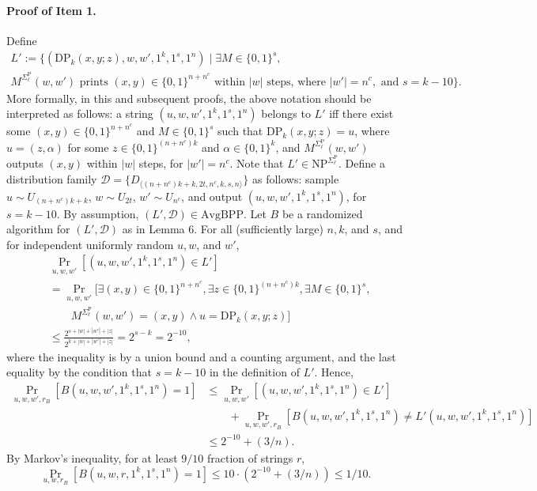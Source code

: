 \paragraph{Proof of Item 1.} Define
\begin{multline*}
L':=\{(\mathrm{DP}_k(x,y;z),w,w',1^k,1^s,1^n)\mid\exists M\in\{0,1\}^s,\\
M^{\Sigma_\ell^{\mathrm P}}(w,w')\text{ prints }(x,y)\in\{0,1\}^{n+n^c}\text{ within }|w|\text{ steps, where }|w'|=n^c,\text{ and }s=k-10\}.
\end{multline*}
More formally, in this and subsequent proofs, the above notation should be interpreted as follows: a string $(u,w,w',1^k,1^s,1^n)$ belongs to $L'$ iff there exist some $(x,y)\in\{0,1\}^{n+n^c}$ and $M\in\{0,1\}^s$ such that $\mathrm{DP}_k(x,y;z)=u$, where $u=(z,\alpha)$ for some $z\in\{0,1\}^{(n+n^c)k}$ and $\alpha\in\{0,1\}^k$, and $M^{\Sigma_\ell^{\mathrm P}}(w,w')$ outputs $(x,y)$ within $|w|$ steps, for $|w'|=n^c$.
Note that $L'\in\mathrm{NP}^{\Sigma_\ell^{\mathrm P}}$. Define a distribution family $\mathcal D=\{D_{\langle(n+n^c)k+k,2t,n^c,k,s,n\rangle}\}$ as follows: sample $u\sim U_{(n+n^c)k+k}$, $w\sim U_{2t}$, $w'\sim U_{n^c}$, and output $(u,w,w',1^k,1^s,1^n)$, for $s=k-10$. By assumption, $(L',\mathcal D)\in\mathrm{AvgBPP}$. Let $B$ be a randomized algorithm for $(L',\mathcal D)$ as in Lemma 6.
For all (sufficiently large) $n,k$, and $s$, and for independent uniformly random $u,w$, and $w'$,
\begin{align*}
&\Pr_{u,w,w'}[(u,w,w',1^k,1^s,1^n)\in L']\\
&=\Pr_{u,w,w'}[\exists(x,y)\in\{0,1\}^{n+n^c},\exists z\in\{0,1\}^{(n+n^c)k},\exists M\in\{0,1\}^s,\\
&\qquad M^{\Sigma_\ell^{\mathrm P}}(w,w')=(x,y)\wedge u=\mathrm{DP}_k(x,y;z)]\\
&\leq\frac{2^{s+|w|+|w'|+|z|}}{2^{k+|w|+|w'|+|z|}}=2^{s-k}=2^{-10},
\end{align*}
where the inequality is by a union bound and a counting argument, and the last equality by the condition that $s=k-10$ in the definition of $L'$. Hence,
\begin{align*}
\Pr_{u,w,w',r_B}[B(u,w,w',1^k,1^s,1^n)=1]
&\leq\Pr_{u,w,w'}[(u,w,w',1^k,1^s,1^n)\in L']\\
&\qquad+\Pr_{u,w,w',r_B}[B(u,w,w',1^k,1^s,1^n)\neq L'(u,w,w',1^k,1^s,1^n)]\\
&\leq2^{-10}+(3/n).
\end{align*}
By Markov's inequality, for at least $9/10$ fraction of strings $r$,
\[\Pr_{u,w,r_B}[B(u,w,r,1^k,1^s,1^n)=1]\leq10\cdot(2^{-10}+(3/n))\leq1/10.\tag{18}\]
